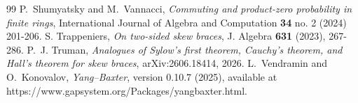 \documentclass[10pt,a4paper]{amsart}
\numberwithin{equation}{section}
\begin{document}
\begin{thebibliography}{99}
 P.~Shumyatsky and M.~Vannacci, \emph{Commuting and product-zero probability in finite rings}, International Journal of Algebra and Computation {\bf 34} no. 2 (2024) 201-206.
 S. Trappeniers, \emph{On two-sided skew braces}, J. Algebra {\bf 631} (2023), 267-286.
 P.~J. Truman, \emph{Analogues of Sylow's first theorem, Cauchy's theorem, and Hall's theorem for skew braces}, arXiv:2606.18414, 2026.
 L.~Vendramin and O.~Konovalov, {\it Yang--Baxter}, version 0.10.7 (2025), available at https://www.gapsystem.org/Packages/yangbaxter.html.
\end{thebibliography}
\end{document}
